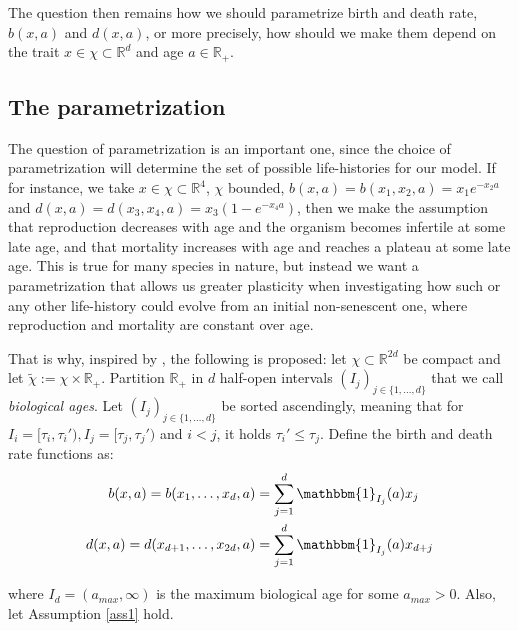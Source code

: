 \documentclass[11pt, a4paper]{article}
\theoremstyle{definition}
\begin{document}
    The question then remains how we should parametrize birth and death rate, $b(x,a)$ and $d(x,a)$, or more precisely, how should we make them depend on the trait $x\in \chi \subset \mathbb{R}^d$ and age $a\in \mathbb{R}_+$.

\subsection{The parametrization}
    The question of parametrization is an important one, since the choice of parametrization will determine the set of possible life-histories for our model. If for instance, we take $x \in \chi \subset \mathbb{R}^4$, $\chi$ bounded, $b(x,a) = b(x_1,x_2, a) = x_1 e^{-x_2 a}$ and $d(x,a) = d(x_3, x_4, a) = x_3 (1 - e^{-x_4a})$, then we make the assumption that reproduction decreases with age and the organism becomes infertile at some late age, and that mortality increases with age and reaches a plateau at some late age. This is true for many species in nature, but instead we want a parametrization that allows us greater plasticity when investigating how such or any other life-history could evolve from an initial non-senescent one, where reproduction and mortality are constant over age.

    That is why, inspired by \autocite{sajina2016silico}, the following is proposed:
    let $\chi \subset \mathbb{R}^{2d}$ be compact and let $\tilde{\chi} := \chi \times \mathbb{R}_+$. Partition $\mathbb{R}_+$ in $d$ half-open intervals $(I_j)_{j \in \{1, \ldots, d\}}$ that we call \emph{biological ages}. Let $(I_j)_{j \in \{1, \ldots, d\}}$ be sorted ascendingly, meaning that for $I_i = [\tau_i, \tau_i'), I_j = [\tau_j, \tau_j')$ and $i<j$, it holds $\tau_i' \leq \tau_j$. Define the birth and death rate functions as:
    \begin{align}
        b(x,a) = b(x_1,\ldots,x_d,a) &= \sum_{j=1}^d \mathbbm{1}_{I_j}(a) x_j \label{eq:bstep}\\
        d(x,a) = d(x_{d+1},\ldots,x_{2d},a) &= \sum_{j=1}^d \mathbbm{1}_{I_j}(a) x_{d+j} \label{eq:dstep}
    \end{align}

    \noindent where $I_d = (a_{max}, \infty)$ is the maximum biological age for some $a_{max}>0$. Also, let Assumption \ref{ass1} hold.
\end{document}
